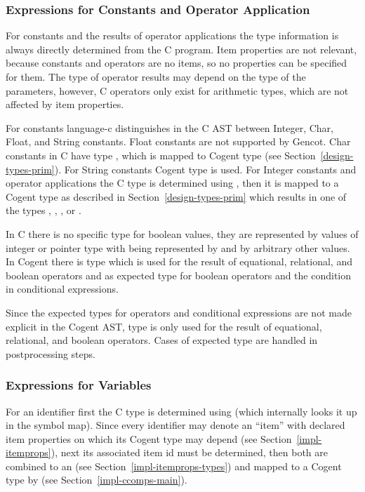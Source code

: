 \subsubsection{Expressions for Constants and Operator Application}

For constants and the results of operator applications the type information is always directly determined from the
C program. Item properties are not relevant, because constants and operators are no items, so no properties can be
specified for them. The type of operator results may depend on the type of the parameters, however, C operators
only exist for arithmetic types, which are not affected by item properties.

For constants language-c distinguishes in the C AST between Integer, Char, Float, and String constants. Float
constants are not supported by Gencot. Char constants in C have type , which is mapped to Cogent type
 (see Section~\ref{design-types-prim}). For String constants Cogent type  is used.
For Integer constants and operator applications the C type is determined using , then it is mapped to a
Cogent type as described in Section~\ref{design-types-prim} which results in one of the types , ,
, or .

In C there is no specific type for boolean values, they are represented by values of integer or pointer type with
 being represented by  and  by arbitrary other values. In Cogent there is type 
which is used for the result of equational, relational, and boolean operators and as expected type for boolean operators
and the condition in conditional expressions.

Since the expected types for operators and conditional expressions are not made explicit in the Cogent AST, type 
is only used for the result of equational, relational, and boolean operators. Cases of expected type 
are handled in postprocessing steps.

\subsubsection{Expressions for Variables}

For an identifier first the C type is determined using  (which internally looks it up in the symbol map).
Since every identifier may denote an ``item'' with declared item properties on which its Cogent type may depend
(see Section~\ref{impl-itemprops}), next its associated item id must be determined, then both are combined to an
 (see Section~\ref{impl-itemprops-types}) and mapped to a Cogent type by 
(see Section~\ref{impl-ccomps-main}).

